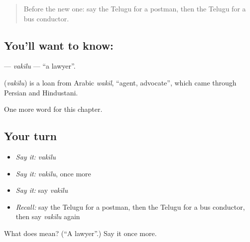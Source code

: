 \begin{quote}
Before the new one: say the Telugu for a postman, then the Telugu for a bus conductor.
\end{quote}

\subsection*{You'll want to know: }
\textbf{} — \emph{vakīlu} — \textquotedblleft{}a lawyer\textquotedblright{}.

\begin{cousinweb}
\textbf{} (\emph{vakīlu}) is a loan from Arabic \emph{wakīl}, \textquotedblleft{}agent, advocate\textquotedblright{}, which came through Persian and Hindustani.
\end{cousinweb}

\begin{grammarlens}[title={What you've built}]
One more word for this chapter.
\end{grammarlens}

\subsection*{Your turn}
\begin{itemize}
\raggedright
  \item \emph{Say it:} \emph{vakīlu}
  \item \emph{Say it:} \emph{vakīlu}, once more
  \item \emph{Say it:} say \emph{vakīlu}
  \item \emph{Recall:} say the Telugu for a postman, then the Telugu for a bus conductor, then say \emph{vakīlu} again
\end{itemize}

\begin{tcolorbox}[breakable,colback=teal!4,colframe=teal!35!black,title={Before you move on}]
What does  mean? (\textquotedblleft{}A lawyer\textquotedblright{}.) Say it once more.
\end{tcolorbox}
